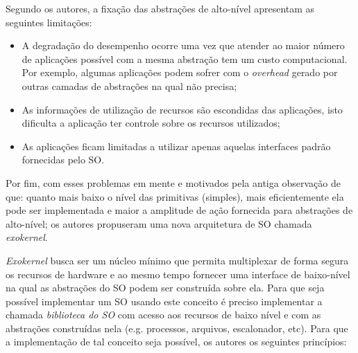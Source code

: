 Segundo os autores, a fixação das abstrações de alto-nível apresentam as
seguintes limitações:

\begin{itemize}
  \item A degradação do desempenho ocorre uma vez que atender ao maior número
        de aplicações possível com a mesma abstração tem um custo
        computacional. Por exemplo, algumas aplicações podem sofrer com o
        \emph{overhead} gerado por outras camadas de abstrações na qual não
        precisa;
  \item As informações de utilização de recursos são escondidas das aplicações,
        isto dificulta a aplicação ter controle sobre os recursos utilizados;
  \item As aplicações ficam limitadas a utilizar apenas aquelas interfaces
        padrão fornecidas pelo SO.
\end{itemize}

Por fim, com esses problemas em mente e motivados pela antiga observação de que:
quanto mais baixo o nível das primitivas (simples), mais eficientemente ela
pode ser implementada e maior a amplitude de ação fornecida para abstrações de
alto-nível; os autores propuseram uma nova arquitetura de SO chamada
\emph{exokernel}.

\emph{Exokernel} busca ser um núcleo mínimo que permita multiplexar de forma
segura os recursos de hardware e ao mesmo tempo fornecer uma interface de
baixo-nível na qual as abstrações do SO podem ser construída sobre ela. Para
que seja possível implementar um SO usando este conceito é preciso implementar
a chamada \textit{biblioteca do SO} com acesso aos recursos de baixo nível e
com as abstrações construídas nela (e.g. processos, arquivos, escalonador,
etc). Para que a implementação de tal conceito seja possível, os autores os
seguintes princípios:

